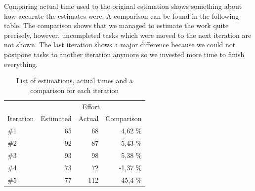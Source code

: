 \documentclass[a4paper]{article}
\begin{document}
Comparing actual time used to the original estimation shows something about how accurate the estimates were. A comparison can be found in the following table. The comparison shows that we managed to estimate the work quite precisely, however, uncompleted tasks which were moved to the next iteration are not shown. The last iteration shows a major difference because we could not postpone tasks to another iteration anymore so we invested more time to finish everything.
\begin{table}[h!]

\centering\begin{tabular}{lrrr}
 & \multicolumn{3}{c}{Effort} \\
 \cline{2-4}
Iteration & Estimated & Actual & Comparison \\
\hline
\#1 & 65 & 68 & 4,62 \% \\
\#2 & 92 & 87 & -5,43 \% \\
\#3 & 93 & 98 & 5,38 \% \\
\#4 & 73 & 72 & -1,37 \% \\
\#5 & 77 & 112 & 45,4 \% \\\hline
\end{tabular}
\caption{List of estimations, actual times and a comparison for each iteration}
\end{table}












\end{document}
